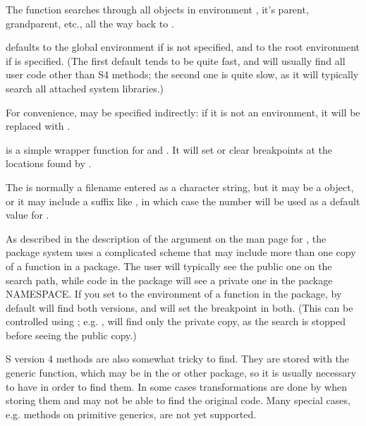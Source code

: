 \begin{Details}\relax
The  function searches through all objects in
environment , it's parent, grandparent, etc., all the way
back to .

 defaults to the global environment if
 is not specified, and to the
root environment  if  is
specified.  (The first default tends to be quite fast, and will
usually find all user code other than S4 methods; the second one is
quite slow, as it will typically search all attached system
libraries.)

For convenience,  may be specified indirectly:  if it is
not an environment, it will be replaced with
.

 is a simple wrapper function for
 and .  It will set or clear
breakpoints at the locations found by .

The  is normally a filename entered as a character
string, but it may be a  object, or it may
include a suffix like , in which case the number
 will be used as a default value for .

As described in the description of the  argument on the
man page for , the \R{} package system uses a
complicated scheme that may include more than one copy of a function
in a package.  The user will typically see the public one on the
search path, while code in the package will see a private one in the
package NAMESPACE.  If you set  to the environment of a
function in the package, by default  will find both
versions, and  will set the breakpoint in both.
(This can be controlled using ; e.g. 
,  will find only the
private copy, as the search is stopped before seeing the public
copy.)

S version 4 methods are also somewhat tricky to find.  They are stored
with the generic function, which may be in the  or other
package, so it is usually necessary to have 
in order to find them.  In some cases transformations are done by \R{}
when storing them and  may not be able to find the
original code.  Many special cases, e.g. methods on primitive
generics, are not yet supported.
\end{Details}
